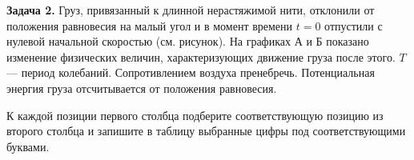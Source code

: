 \begin{taskbasic}[code={\label{task:energy_v2_n6}}]
\textbf{Задача 2.} Груз, привязанный к длинной нерастяжимой нити, отклонили от положения равновесия на малый угол и в момент времени $t=0$ отпустили с нулевой начальной скоростью (см. рисунок). На графиках А и Б показано изменение физических величин, характеризующих движение груза после этого. $T$ — период колебаний. Сопротивлением воздуха пренебречь. Потенциальная энергия груза отсчитывается от положения равновесия.

\nopagebreak\smallskip
\begin{center}
\end{center}

К каждой позиции первого столбца подберите соответствующую позицию из второго столбца и запишите в таблицу выбранные цифры под соответствующими буквами.


\end{taskbasic}
